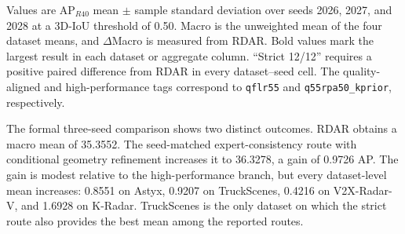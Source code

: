 \documentclass[preprint,12pt,times]{elsarticle}
\newcommand{\reviewcaption}[1]{\caption{\textcolor{floatreviewblue}{#1}}}
\newcommand{\reviewcaption}[1]{\caption{#1}}
\begin{document}
\begin{table}[!t]
\centering
\reviewcaption{Main three-seed comparison of RDAR and the quality-aligned,
high-performance, and strict routes.}
\label{tab:main-results}
\begingroup
\color{black}
\scriptsize
\setlength{\tabcolsep}{5pt}
\renewcommand{\arraystretch}{1.20}
\endgroup
\vspace{2pt}
\parbox{\textwidth}{\scriptsize
Values are AP$_{R40}$ mean $\pm$ sample standard deviation over seeds 2026,
2027, and 2028 at a 3D-IoU threshold of 0.50. Macro is the unweighted mean of
the four dataset means, and $\Delta$Macro is measured from RDAR. Bold values
mark the largest result in each dataset or aggregate column. ``Strict 12/12''
requires a positive paired difference from RDAR in every dataset--seed cell.
The quality-aligned and high-performance tags correspond to
\texttt{qflr55} and \texttt{q55rpa50\_kprior}, respectively.}
\end{table}

The formal three-seed comparison shows two distinct outcomes. RDAR obtains a macro mean of
35.3552. The seed-matched expert-consistency route with conditional geometry
refinement increases it to 36.3278, a gain of 0.9726 AP.
The gain is modest relative to the high-performance branch, but every
dataset-level mean increases: 0.8551 on Astyx, 0.9207 on TruckScenes, 0.4216
on V2X-Radar-V, and 1.6928 on K-Radar. TruckScenes is the only dataset on
which the strict route also provides the best mean among the reported routes.
\end{document}
